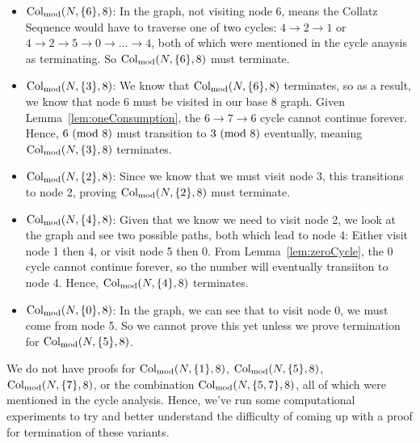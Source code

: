 \begin{itemize}
    \item \textbf{$\mathrm{Col}_{\text{mod}}(N,\{6\},8)$}: In the graph, not visiting node $6$, means the Collatz Sequence would have to traverse one of two cycles: $4 \rightarrow 2 \rightarrow 1$ or $4 \rightarrow 2 \rightarrow 5 \rightarrow 0 \rightarrow \ldots \rightarrow 4$, both of which were mentioned in the cycle anaysis as terminating. So $\mathrm{Col}_{\text{mod}}(N,\{6\},8)$ must terminate.
    \item \textbf{$\mathrm{Col}_{\text{mod}}(N,\{3\},8)$}: We know that $\mathrm{Col}_{\text{mod}}(N,\{6\},8)$ terminates, so as a result, we know that node 6 must be visited in our base 8 graph.  Given Lemma~\ref{lem:oneConsumption}, the $6 \rightarrow 7 \rightarrow 6$ cycle cannot continue forever. Hence, $6\ (\mathrm{mod}\ 8)$ must transition to $3\ (\mathrm{mod}\ 8)$ eventually, meaning $\mathrm{Col}_{\text{mod}}(N,\{3\},8)$ terminates.
    \item \textbf{$\mathrm{Col}_{\text{mod}}(N,\{2\},8)$}: Since we know that we must visit node 3, this transitions to node 2, proving $\mathrm{Col}_{\text{mod}}(N,\{2\},8)$ must terminate.
    \item \textbf{$\mathrm{Col}_{\text{mod}}(N,\{4\},8)$}: Given that we know we need to visit node 2, we look at the graph and see two possible paths, both which lead to node 4: Either visit node 1 then 4, or visit node 5 then 0. From Lemma~\ref{lem:zeroCycle}, the 0 cycle cannot continue forever, so the number will eventually transiiton to node 4. Hence, $\mathrm{Col}_{\text{mod}}(N,\{4\},8)$ terminates.
    \item \textbf{$\mathrm{Col}_{\text{mod}}(N,\{0\},8)$}: In the graph, we can see that to visit node 0, we must come from node 5. So we cannot prove this yet unless we prove termination for $\mathrm{Col}_{\text{mod}}(N,\{5\},8)$.
\end{itemize}
We do not have proofs for $\mathrm{Col}_{\text{mod}}(N,\{1\},8)$, $\mathrm{Col}_{\text{mod}}(N,\{5\},8)$, $\mathrm{Col}_{\text{mod}}(N,\{7\},8)$, or the combination $\mathrm{Col}_{\text{mod}}(N,\{5,7\},8)$, all of which were mentioned in the cycle analysis. Hence, we've run some computational experiments to try and better understand the difficulty of coming up with a proof for termination of these variants. 
